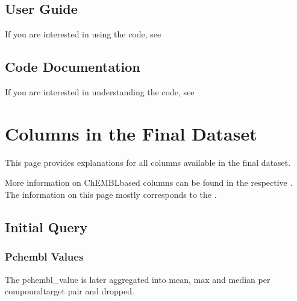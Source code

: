 \documentclass[letterpaper,10pt,english]{sphinxmanual}
\begin{document}
\section{User Guide}
\label{\detokenize{introduction:user-guide}}
\sphinxAtStartPar
If you are interested in using the code, see {\hyperref[\detokenize{user_guide::doc}]{}}


\section{Code Documentation}
\label{\detokenize{introduction:code-documentation}}
\sphinxAtStartPar
If you are interested in understanding the code, see {\hyperref[\detokenize{modules::doc}]{}}

\sphinxstepscope


\chapter{Columns in the Final Dataset}
\label{\detokenize{columns_docs:columns-in-the-final-dataset}}\label{\detokenize{columns_docs::doc}}
\sphinxAtStartPar
This page provides explanations for all columns available in the final dataset.

\sphinxAtStartPar
More information on ChEMBL\sphinxhyphen{}based columns can be found in the respective .
The information on this page mostly corresponds to the .


\section{Initial Query}
\label{\detokenize{columns_docs:initial-query}}

\subsection{Pchembl Values}
\label{\detokenize{columns_docs:pchembl-values}}
\sphinxAtStartPar
The pchembl\_value is later aggregated into mean, max and median per compound\sphinxhyphen{}target pair and dropped.
\end{document}
